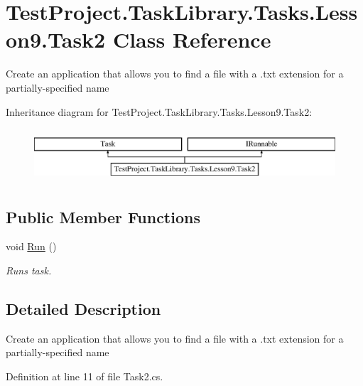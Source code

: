 \hypertarget{class_test_project_1_1_task_library_1_1_tasks_1_1_lesson9_1_1_task2}{}\section{Test\+Project.\+Task\+Library.\+Tasks.\+Lesson9.\+Task2 Class Reference}
\label{class_test_project_1_1_task_library_1_1_tasks_1_1_lesson9_1_1_task2}


Create an application that allows you to find a file with a .txt extension for a partially-\/specified name  


Inheritance diagram for Test\+Project.\+Task\+Library.\+Tasks.\+Lesson9.\+Task2\+:\begin{figure}[H]
\begin{center}
\leavevmode
\includegraphics[height=2.000000cm]{class_test_project_1_1_task_library_1_1_tasks_1_1_lesson9_1_1_task2}
\end{center}
\end{figure}
\subsection*{Public Member Functions}
\begin{DoxyCompactItemize}
\item 
void \mbox{\hyperlink{class_test_project_1_1_task_library_1_1_tasks_1_1_lesson9_1_1_task2_a932ed6bdd2d1c5de7f5ffafdf46dfb3a}{Run}} ()
\begin{DoxyCompactList}\small\item\em Runs task. \end{DoxyCompactList}\end{DoxyCompactItemize}


\subsection{Detailed Description}
Create an application that allows you to find a file with a .txt extension for a partially-\/specified name 



Definition at line 11 of file Task2.\+cs.



